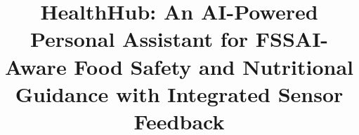 \documentclass[conference]{IEEEtran}
\begin{document}
\title{HealthHub: An AI-Powered Personal Assistant for FSSAI-Aware Food Safety and Nutritional Guidance with Integrated Sensor Feedback}

\author{
}

\maketitle









\begin{thebibliography}{16}

\end{thebibliography}
\end{document}
